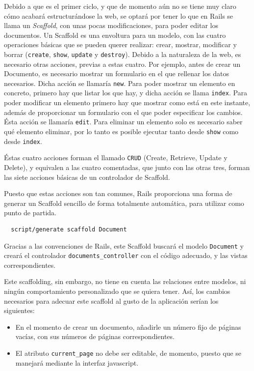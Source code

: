Debido a que es el primer ciclo, y que de momento aún no se tiene muy claro cómo acabará estructurándose la web, se optará por tener lo que en Rails se llama un \emph{Scaffold}, con unas pocas modificaciones, para poder editar los documentos. Un Scaffold es una envoltura para un modelo, con las cuatro operaciones básicas que se pueden querer realizar: crear, mostrar, modificar y borrar (\texttt{create}, \texttt{show}, \texttt{update} y \texttt{destroy}). Debido a la naturaleza de la web, es necesario otras acciones, previas a estas cuatro. Por ejemplo, antes de crear un Documento, es necesario mostrar un formulario en el que rellenar los datos necesarios. Dicha acción se llamaría \texttt{new}. Para poder mostrar un elemento en concreto, primero hay que listar los que hay, y dicha acción se llama \texttt{index}. Para poder modificar un elemento primero hay que mostrar como está en este instante, además de proporcionar un formulario con el que poder especificar los cambios. Ésta acción se llamaría \texttt{edit}. Para eliminar un elemento solo es necesario saber qué elemento eliminar, por lo tanto es posible ejecutar tanto desde \texttt{show} como desde \texttt{index}.

Éstas cuatro acciones forman el llamado \texttt{CRUD} (Create, Retrieve, Update y Delete), y equivalen a las cuatro comentadas, que junto con las otras tres, forman las siete acciones básicas de un controlador de Scaffold.

Puesto que estas acciones son tan comunes, Rails proporciona una forma de generar un Scaffold sencillo de forma totalmente automática, para utilizar como punto de partida.

\begin{verbatim}
  script/generate scaffold Document
\end{verbatim}

Gracias a las convenciones de Rails, este Scaffold buscará el modelo \texttt{Document} y creará el controlador \texttt{documents\_controller} con el código adecuado, y las vistas correspondientes.

Este scaffolding, sin embargo, no tiene en cuenta las relaciones entre modelos, ni ningún comportamiento personalizado que se quiera tener. Así, los cambios necesarios para adecuar este scaffold al gusto de la aplicación serían los siguientes:

\begin{itemize}
  \item En el momento de crear un documento, añadirle un número fijo de páginas vacías, con sus números de páginas correspondientes.
  \item El atributo \texttt{current\_page} no debe ser editable, de momento, puesto que se manejará mediante la interfaz javascript.
\end{itemize}


